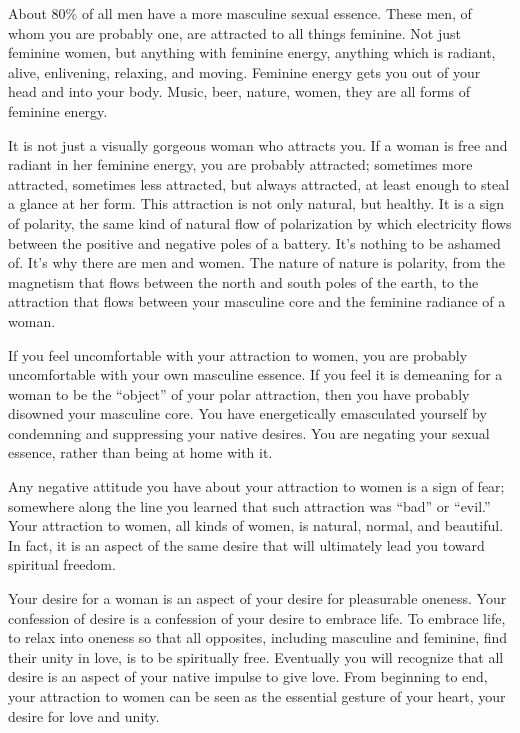 			About 80\% of all men have a more masculine sexual essence. These men, of whom you are probably one, are attracted to all things feminine. Not just feminine women, but anything with feminine energy, anything which is radiant, alive, enlivening, relaxing, and moving. Feminine energy gets you out of your head and into your body. Music, beer, nature, women, they are all forms of feminine energy. 

			It is not just a visually gorgeous woman who attracts you. If a woman is free and radiant in her feminine energy, you are probably attracted; sometimes more attracted, sometimes less attracted, but always attracted, at least enough to steal a glance at her form. This attraction is not only natural, but healthy. It is a sign of polarity, the same kind of natural flow of polarization by which electricity flows between the positive and negative poles of a battery. It's nothing to be ashamed of. It's why there are men and women. The nature of nature is polarity, from the magnetism that flows between the north and south poles of the earth, to the attraction that flows between your masculine core and the feminine radiance of a woman. 

			If you feel uncomfortable with your attraction to women, you are probably uncomfortable with your own masculine essence. If you feel it is demeaning for a woman to be the ``object'' of your polar attraction, then you have probably disowned your masculine core. You have energetically emasculated yourself by condemning and suppressing your native desires. You are negating your sexual essence, rather than being at home with it. 

			Any negative attitude you have about your attraction to women is a sign of fear; somewhere along the line you learned that such attraction was ``bad'' or ``evil.'' Your attraction to women, all kinds of women, is natural, normal, and beautiful. In fact, it is an aspect of the same desire that will ultimately lead you toward spiritual freedom. 

			Your desire for a woman is an aspect of your desire for pleasurable oneness. Your confession of desire is a confession of your desire to embrace life. To embrace life, to relax into oneness so that all opposites, including masculine and feminine, find their unity in love, is to be spiritually free. Eventually you will recognize that all desire is an aspect of your native impulse to give love. From beginning to end, your attraction to women can be seen as the essential gesture of your heart, your desire for love and unity. 

